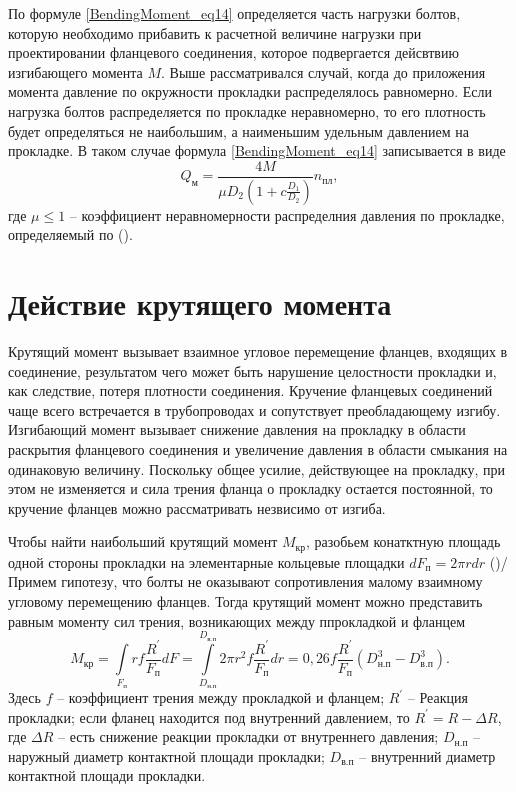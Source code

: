 По формуле \eqref{BendingMoment_eq14} определяется часть нагрузки болтов, которую необходимо прибавить к расчетной величине нагрузки при проектировании фланцевого соединения, которое подвергается дейсвтвию изгибающего момента $M$.
Выше рассматривался случай, когда до приложения момента давление по окружности прокладки распределялось равномерно.
Если нагрузка болтов распределяется по прокладке неравномерно, то его плотность будет определяться не наибольшим, а наименьшим удельным давлением на прокладке.
В таком случае формула \eqref{BendingMoment_eq14} записывается в виде
\begin{equation}
  \label{BendingMoment_eq15}
  Q_{\text{м}}=\frac{4M}{\mu D_2\left(1+c\frac{D_1}{D_2}\right)}n_{\text{пл}},
\end{equation}  
где $\mu \le 1$ -- коэффициент неравномерности распределния давления по прокладке, определяемый по ().



\section{Действие крутящего момента}
\label{Torque}

Крутящий момент вызывает взаимное угловое перемещение фланцев, входящих в соединение, результатом чего может быть нарушение целостности прокладки и, как следствие, потеря плотности соединения.
Кручение фланцевых соединений чаще всего встречается в трубопроводах и сопутствует преобладающему изгибу.
Изгибающий момент вызывает снижение давления на прокладку в области раскрытия фланцевого соединения и увеличение давления в области смыкания на одинаковую величину.
Поскольку общее усилие, действующее на прокладку, при этом не изменяется и сила трения фланца о прокладку остается постоянной, то кручение фланцев можно рассматривать незвисимо от изгиба.

Чтобы найти наибольший крутящий момент $M_{\text{кр}}$, разобьем конатктную площадь одной стороны прокладки на элементарные кольцевые площадки $dF_{\text{п}}=2\pi rdr$ ()/
Примем гипотезу, что болты не оказывают сопротивления малому взаимному угловому перемещению фланцев.
Тогда крутящий момент можно представить равным моменту сил трения, возникающих между ппрокладкой и фланцем
\begin{equation}
  \label{Torque_eq1}
  M_{\text{кр}}=\int\limits_{F_{\text{п}}}rf\frac{R^{\prime}}{F_{\text{п}}}dF=\int\limits_{D_{\text{н.п}}}^{D_{\text{в.п}}}2\pi r^2f\frac{R^{\prime}}{F_{\text{п}}}dr=0,26f\frac{R^{\prime}}{F_{\text{п}}}\left(D_{\text{н.п}}^3-D_{\text{в.п}}^3\right).
\end{equation} 
Здесь $f$ -- коэффициент трения между прокладкой и фланцем;
$R^{\prime}$ -- Реакция прокладки; если фланец находится под внутренний давлением, то $R^{\prime}=R-\Delta R$, где $\Delta R$ -- есть снижение реакции прокладки от внутреннего давления;
$D_{\text{н.п}}$ -- наружный диаметр контактной площади прокладки;
$D_{\text{в.п}}$ -- внутренний диаметр контактной площади прокладки.

